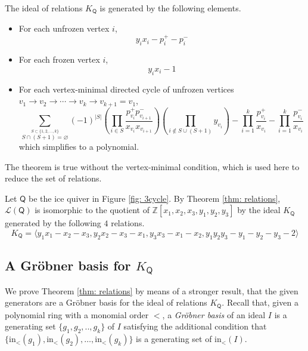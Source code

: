\documentclass[ALCO,published]{cedram}
\numberwithin{equation}{section}
\renewcommand{\L}{\mathcal{L}}%
\renewcommand{\emptyset}{\varnothing}
\newcommand{\1}{^{-1}}
\def\ZZ{\mathbb{Z}}
\def\Q{\mathsf{Q}}
\begin{document}
\begin{thm}\label{thm: relations}
The ideal of relations $K_\Q$ is generated by the following elements.
\begin{itemize}
	\item For each unfrozen vertex $i$, 
\begin{equation}\label{eq: mutationrel}
y_ix_i - p_i^+-p_i^-
\end{equation}
	\item For each frozen vertex $i$, 
\begin{equation}\label{eq: inverserel}
y_ix_i-1 
\end{equation}
	\item For each vertex-minimal %
	directed cycle of unfrozen vertices $v_1\rightarrow v_2 \rightarrow \cdots \rightarrow v_k\rightarrow v_{k+1}=v_1$,
\begin{equation}%
\sum_{\stackrel{S\subset \{1,2,\dots,k\}}{S\cap (S+1)=\emptyset}} (-1)^{|S|}\left(\prod_{i\in S} \frac{p_{v_i}^+p_{v_{i+1}}^-}{x_{v_i}x_{v_{i+1}}}\right)\left(\prod_{i\not\in S\cup (S+1)} y_{v_i}\right) - \prod_{i=1}^k\frac{p_{v_i}^+}{x_{v_i}}- \prod_{i=1}^k\frac{p_{v_i}^-}{x_{v_i}}
\end{equation}
which simplifies to a polynomial.
\end{itemize}
\end{thm}
\noindent The theorem is true without the vertex-minimal condition, which is used here to reduce the set of relations.

\begin{ex}\label{ex:3vertexgrobner}
Let $\Q$ be the ice quiver in Figure \ref{fig: 3cycle}.  By Theorem \ref{thm: relations}, $\L(\Q)$ is isomorphic to the quotient of $\ZZ[x_1,x_2,x_3,y_1,y_2,y_3]$ by the ideal $K_\Q$ generated by the following $4$ relations.
\[ K_\Q =\langle y_1x_1-x_2-x_3,y_2 x_2-x_3-x_1, y_3x_3-x_1-x_2, y_1y_2y_3-y_1-y_2-y_3-2\rangle \]
\end{ex}

\subsection{A Gr\"obner basis for $K_\Q$}

We prove Theorem \ref{thm: relations} by means of a stronger result, that the given generators are a Gr\"obner basis for the ideal of relations $K_\Q$. 
Recall that, given a polynomial ring with a monomial order $<$, a \textit{Gr\"obner basis} of an ideal $I$ is a generating set $\{g_1,g_2,..,g_k\}$ of $I$ satisfying the additional condition that $\{\text{in}_<(g_1),\text{in}_<(g_2),\dots,\text{in}_<(g_k)\}$ is a generating set of $\text{in}_<(I)$.  
\end{document}
